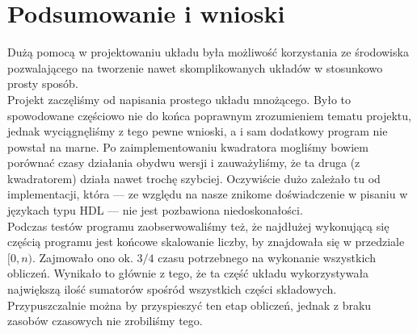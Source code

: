 \documentclass[a4paper]{article}
\begin{document}
\section{Podsumowanie i wnioski}
Dużą pomocą w projektowaniu układu była możliwość korzystania ze środowiska pozwalającego na tworzenie nawet 
skomplikowanych układów w stosunkowo prosty sposób. \\ \indent
Projekt zaczęliśmy od napisania prostego układu mnożącego. Było to spowodowane częściowo nie do końca poprawnym zrozumieniem tematu projektu,
jednak wyciągnęliśmy z tego pewne wnioski, a i sam dodatkowy program nie powstał na marne. Po zaimplementowaniu kwadratora mogliśmy
bowiem porównać czasy działania obydwu wersji i zauważyliśmy, że ta druga (z kwadratorem) działa nawet trochę szybciej. Oczywiście 
dużo zależało tu od implementacji, która --- ze względu na nasze znikome doświadczenie w pisaniu w językach typu HDL --- nie jest 
pozbawiona niedoskonałości. \\ \indent
Podczas testów programu zaobserwowaliśmy też, że najdłużej wykonującą się częścią programu jest końcowe skalowanie liczby, by 
znajdowała się w przedziale $[0, n)$. 
Zajmowało ono ok. $3/4$ czasu potrzebnego na wykonanie wszystkich obliczeń. Wynikało to głównie z tego, że ta część układu wykorzystywała
największą ilość sumatorów spośród wszystkich części składowych. Przypuszczalnie można by przyspieszyć ten etap obliczeń, jednak
z braku zasobów czasowych nie zrobiliśmy tego.\\ \indent




\end{document}
